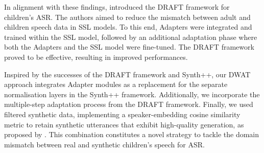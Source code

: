 In alignment with these findings, \cite{fan2022draft} introduced the \ac{DRAFT} framework for children's \ac{ASR}. The authors aimed to reduce the mismatch between adult and children speech data in \ac{SSL} models. To this end, Adapters were integrated and trained within the \ac{SSL} model, followed by an additional adaptation phase where both the Adapters and the \ac{SSL} model were fine-tuned. The \ac{DRAFT} framework proved to be effective, resulting in improved performances.


Inspired by the successes of the \ac{DRAFT} framework and Synth++, our \ac{DWAT} approach integrates Adapter modules as a replacement for the separate normalisation layers in the Synth++ framework. Additionally, we incorporate the multiple-step adaptation process from the \ac{DRAFT} framework. Finally, we used filtered synthetic data, implementing a speaker-embedding cosine similarity metric to retain synthetic utterances that exhibit high-quality generation, as proposed by \cite{wang2021towards}. This combination constitutes a novel strategy to tackle the domain mismatch between real and synthetic children's speech for \ac{ASR}.



